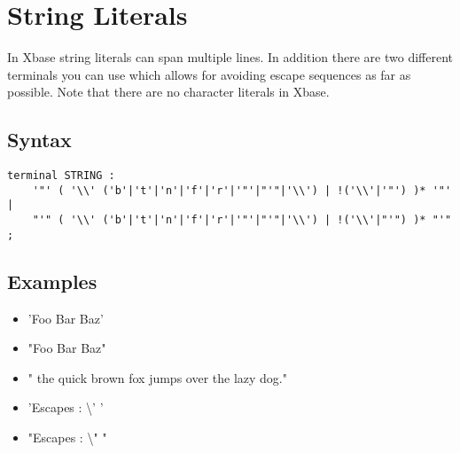 \documentclass[a4paper,10pt]{scrreprt}
\newlength{\itemindentlen}
\begin{document}
\section{String Literals\label{StringLiterals}}
In Xbase string literals can span multiple lines. In addition there are two different terminals you can use which allows for avoiding escape sequences as far as possible.
Note that there are no character literals in Xbase.

\subsection{Syntax}
\begin{lstlisting}
terminal STRING	: 
	'"' ( '\\' ('b'|'t'|'n'|'f'|'r'|'"'|"'"|'\\') | !('\\'|'"') )* '"' |
	"'" ( '\\' ('b'|'t'|'n'|'f'|'r'|'"'|"'"|'\\') | !('\\'|"'") )* "'"
;

\end{lstlisting}





\subsection{Examples}

\setlength{\itemindentlen}{\textwidth}
\begin{itemize}
\addtolength{\itemindentlen}{-2em}

\item \begin{minipage}[t]{\itemindentlen}
'Foo Bar Baz'
\end{minipage}

\item \begin{minipage}[t]{\itemindentlen}
"Foo Bar Baz"
\end{minipage}

\item \begin{minipage}[t]{\itemindentlen}
" the quick brown fox 
		   jumps over the lazy dog."
\end{minipage}

\item \begin{minipage}[t]{\itemindentlen}
'Escapes : \textbackslash{}' '
\end{minipage}

\item \begin{minipage}[t]{\itemindentlen}
"Escapes : \textbackslash{}" "
\end{minipage}

\end{itemize}
\addtolength{\itemindentlen}{2em}
\end{document}

